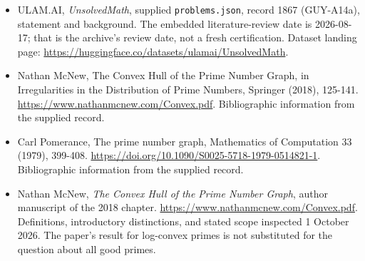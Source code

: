 \documentclass[11pt,a4paper]{article}
\begin{document}
{\small

\begin{itemize}

\item[\hypertarget{source:1867:1}{S1}] ULAM.AI, \emph{UnsolvedMath}, supplied \texttt{problems.json}, record 1867 (GUY-A14a), statement and background. The embedded literature-review date is 2026-08-17; that is the archive’s review date, not a fresh certification. Dataset landing page: \url{https://huggingface.co/datasets/ulamai/UnsolvedMath}.

\item[\hypertarget{source:1867:2}{S2}] Nathan McNew, The Convex Hull of the Prime Number Graph, in Irregularities in the Distribution of Prime Numbers, Springer (2018), 125-141. \url{https://www.nathanmcnew.com/Convex.pdf}. Bibliographic information from the supplied record.

\item[\hypertarget{source:1867:3}{S3}] Carl Pomerance, The prime number graph, Mathematics of Computation 33 (1979), 399-408. \url{https://doi.org/10.1090/S0025-5718-1979-0514821-1}. Bibliographic information from the supplied record.


\item[E1] Nathan McNew, \emph{The Convex Hull of the Prime Number
Graph}, author manuscript of the 2018 chapter.
\url{https://www.nathanmcnew.com/Convex.pdf}.
Definitions, introductory distinctions, and stated scope inspected
1 October 2026. The paper's result for log-convex primes is not
substituted for the question about all good primes.

\end{itemize}

}

\label{end:1867}
\end{document}
